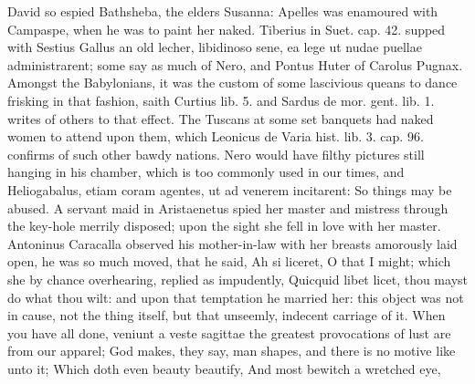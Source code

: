 David so espied Bathsheba, the elders Susanna: Apelles was
enamoured with Campaspe, when he was to paint her naked. Tiberius in
Suet. cap. 42. supped with Sestius Gallus an old lecher, libidinoso
sene, ea lege ut nudae puellae administrarent; some say as much of
Nero, and Pontus Huter of Carolus Pugnax. Amongst the Babylonians, it
was the custom of some lascivious queans to dance frisking in that
fashion, saith Curtius lib. 5. and Sardus de mor. gent. lib. 1. writes
of others to that effect. The Tuscans at some set banquets had
naked women to attend upon them, which Leonicus de Varia hist. lib. 3.
cap. 96. confirms of such other bawdy nations. Nero would have filthy
pictures still hanging in his chamber, which is too commonly used in
our times, and Heliogabalus, etiam coram agentes, ut ad venerem
incitarent: So things may be abused. A servant maid in Aristaenetus
spied her master and mistress through the key-hole merrily
disposed; upon the sight she fell in love with her master.
Antoninus Caracalla observed his mother-in-law with her breasts
amorously laid open, he was so much moved, that he said, Ah si liceret,
O that I might; which she by chance overhearing, replied as impudently,
Quicquid libet licet, thou mayst do what thou wilt: and upon that
temptation he married her: this object was not in cause, not the thing
itself, but that unseemly, indecent carriage of it.
When you have all done, veniunt a veste sagittae the greatest
provocations of lust are from our apparel; God makes, they say, man
shapes, and there is no motive like unto it;
Which doth even beauty beautify,
And most bewitch a wretched eye,

